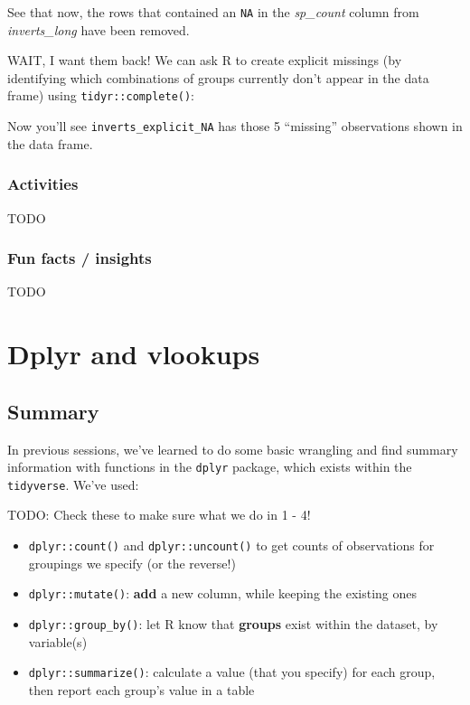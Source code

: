 \documentclass[]{book}
\newenvironment{Shaded}{\begin{snugshade}}{\end{snugshade}}
\newcommand{\KeywordTok}[1]{\textcolor[rgb]{0.13,0.29,0.53}{\textbf{#1}}}
\newcommand{\NormalTok}[1]{#1}
\newcommand{\OperatorTok}[1]{\textcolor[rgb]{0.81,0.36,0.00}{\textbf{#1}}}
\newcommand{\StringTok}[1]{\textcolor[rgb]{0.31,0.60,0.02}{#1}}
\providecommand{\tightlist}{%
  \setlength{\itemsep}{0pt}\setlength{\parskip}{0pt}}
\begin{document}
See that now, the rows that contained an \texttt{NA} in the \emph{sp\_count} column from \emph{inverts\_long} have been removed.

WAIT, I want them back! We can ask R to create explicit missings (by identifying which combinations of groups currently don't appear in the data frame) using \texttt{tidyr::complete()}:

\begin{Shaded}
\end{Shaded}

Now you'll see \texttt{inverts\_explicit\_NA} has those 5 ``missing'' observations shown in the data frame.

\hypertarget{activities}{%
\subsection{Activities}\label{activities}}

TODO

\hypertarget{fun-facts-insights}{%
\subsection{Fun facts / insights}\label{fun-facts-insights}}

TODO

\hypertarget{vlookup}{%
\chapter{Dplyr and vlookups}\label{vlookup}}

\hypertarget{summary-5}{%
\section{Summary}\label{summary-5}}

In previous sessions, we've learned to do some basic wrangling and find summary information with functions in the \texttt{dplyr} package, which exists within the \texttt{tidyverse}. We've used:

TODO: Check these to make sure what we do in 1 - 4!

\begin{itemize}
\tightlist
\item
  \texttt{dplyr::count()} and \texttt{dplyr::uncount()} to get counts of observations for groupings we specify (or the reverse!)
\item
  \texttt{dplyr::mutate()}: \textbf{add} a new column, while keeping the existing ones
\item
  \texttt{dplyr::group\_by()}: let R know that \textbf{groups} exist within the dataset, by variable(s)
\item
  \texttt{dplyr::summarize()}: calculate a value (that you specify) for each group, then report each group's value in a table
\end{itemize}
\end{document}
